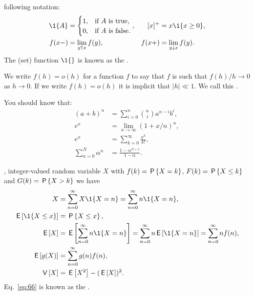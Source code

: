 \documentclass[queueing-book]{subfiles}
\begin{document}
 following notation:
 \begin{align*}
 \1{A} &=
 \begin{cases}
 1, & \text{if $A$ is true}, \\
 0, & \text{if $A$ is false}.
 \end{cases},
& [x]^+ &= x \1{x\geq 0}, \\
 f(x-) &= \lim_{y\uparrow x} f(y), &
 f(x+) &= \lim_{y\downarrow x} f(y).
\end{align*}
The (set) function $\1{}$ is known as the .

We write $f(h)=o(h)$ for a function $f$ to say that $f$ is such that $f(h)/h \to 0$ as $h\to 0$.
If we write $f(h) = o(h)$ it is implicit that $|h| \ll 1$.
We call this .


You should know that:
\begin{subequations}
 \begin{align}
 (a+b)^n &= \sum_{i=0}^n {n \choose i} a^{n-i} b^i, \label{eq:71}\\
e^x &= \lim_{n\to\infty} (1+x/n)^n, \label{eq:65}\\
 e^x &= \sum_{k=0}^{\infty} \frac{x^k}{k!}, \label{eq:76}\\
 \sum_{n=0}^N \alpha^n &= \frac{1-\alpha^{N+1}}{1-\alpha}. \label{eq:61}
\end{align}
\end{subequations}

, integer-valued random variable $X$ with  $f(k)= \P{X = k}$,
 $F(k)=\P{X\leq k}$ and  $G(k) = \P{X>k}$ we have
\begin{subequations}\label{eq:105}
\begin{align}
X&=\sum_{n=0}^\infty X\1{X=n} = \sum_{n=0}^\infty n \1{X=n}, \label{eq:77} \\
\E{\1{X\leq x}} &= \P{X\leq x}, \label{eq:74}\\
\E X &= \E{\sum_{n=0}^\infty n \1{X=n}} = \sum_{n=0}^\infty n \E{\1{X=n}} = \sum_{n=0}^\infty n f(n), \label{eq:p-78} \\
  \E{g(X)} &= \sum_{n=0}^\infty g(n) f(n), \label{eq:66} \\
  \V X &= \E{X^2} - (\E X)^2.\label{eq:68}\\
\end{align}
\end{subequations}
Eq.~\cref{eq:66} is known as the .
\end{document}
